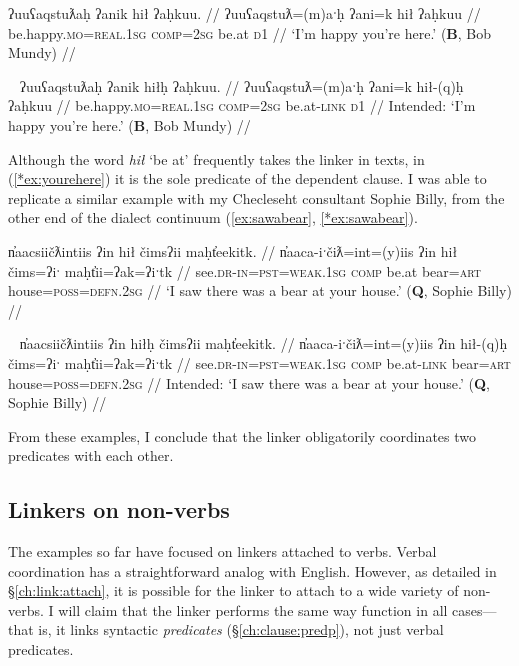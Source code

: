 \ex \label{ex:yourehere}
\begingl
\glpreamble ʔuuʕaqstuƛaḥ ʔanik hił ʔaḥkuu. //
\gla ʔuuʕaqstuƛ=(m)aˑḥ ʔani=k hił ʔaḥkuu //
\glb be.happy.\textsc{mo}=\textsc{real.1sg} \textsc{comp}=\textsc{2sg} be.at \textsc{d1} //
\glft `I'm happy you're here.' (\textbf{B}, Bob Mundy) //
\endgl
\xe

\ex~ \label{*ex:yourehere}
\begingl
\glpreamble *ʔuuʕaqstuƛaḥ ʔanik hiłḥ ʔaḥkuu. //
\gla ʔuuʕaqstuƛ=(m)aˑḥ ʔani=k hił-(q)ḥ ʔaḥkuu //
\glb be.happy.\textsc{mo}=\textsc{real.1sg} \textsc{comp}=\textsc{2sg} be.at-\textsc{link} \textsc{d1} //
\glft Intended: `I'm happy you're here.' (\textbf{B}, Bob Mundy) //
\endgl
\xe

Although the word \textit{hił} `be at' frequently takes the linker in texts, in (\ref{*ex:yourehere}) it is the sole predicate of the dependent clause. I was able to replicate a similar example with my Checleseht consultant Sophie Billy, from the other end of the dialect continuum (\ref{ex:sawabear}, \ref{*ex:sawabear}).

\ex \label{ex:sawabear}
\begingl
\glpreamble n̓aacsiičƛintiis ʔin hił čimsʔii maḥt̓eekitk. //
\gla n̓aaca-iˑčiƛ=int=(y)iis ʔin hił čims=ʔiˑ maḥt̓ii=ʔak=ʔiˑtk //
\glb see.\textsc{dr}-\textsc{in}=\textsc{pst}=\textsc{weak.1sg} \textsc{comp} be.at bear=\textsc{art} house=\textsc{poss}=\textsc{defn.2sg} //
\glft `I saw there was a bear at your house.' (\textbf{Q}, Sophie Billy) //
\endgl
\xe

\ex~ \label{*ex:sawabear}
\begingl
\glpreamble *n̓aacsiičƛintiis ʔin hiłḥ čimsʔii maḥt̓eekitk. //
\gla n̓aaca-iˑčiƛ=int=(y)iis ʔin hił-(q)ḥ čims=ʔiˑ maḥt̓ii=ʔak=ʔiˑtk //
\glb see.\textsc{dr}-\textsc{in}=\textsc{pst}=\textsc{weak.1sg} \textsc{comp} be.at-\textsc{link} bear=\textsc{art} house=\textsc{poss}=\textsc{defn.2sg} //
\glft Intended: `I saw there was a bear at your house.' (\textbf{Q}, Sophie Billy) //
\endgl
\xe

From these examples, I conclude that the linker obligatorily coordinates two predicates with each other.

\subsection{Linkers on non-verbs} \label{ch:link:nonverb}

The examples so far have focused on linkers attached to verbs. Verbal coordination has a straightforward analog with English. However, as detailed in \S\ref{ch:link:attach}, it is possible for the linker to attach to a wide variety of non-verbs. I will claim that the linker performs the same way function in all cases---that is, it links syntactic \textit{predicates} (\S\ref{ch:clause:predp}), not just verbal predicates.

